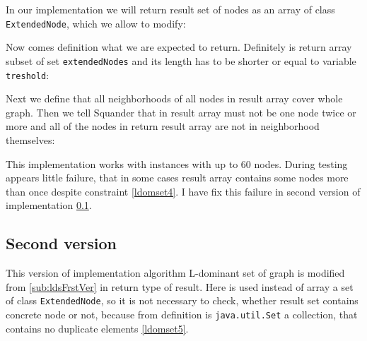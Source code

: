 \documentclass[11pt,twoside,a4paper]{book}
\begin{document}
In our implementation we will return result set of nodes as an array of
class \verb|ExtendedNode|, which we allow to modify:



Now comes definition what we are expected to return. Definitely is return array
subset of set \verb|extendedNodes| and its length has to be shorter or equal to
variable \verb|treshold|:



Next we define that all neighborhoods of all nodes in result array cover
whole graph. Then we tell Squander that in result array must not be one node
twice or more and all of the nodes in return result array are not in
neighborhood themselves:



This implementation works with instances with up to 60 nodes. During
testing appears little failure, that in some cases result array contains some
nodes more than once despite constraint \ref{ldomset4}. I have fix this failure
in second version of implementation \ref{sub:ldsScndVer}.



\subsection{Second version}
\label{sub:ldsScndVer}

This version of implementation algorithm L-dominant set of graph is modified
from \ref{sub:ldsFrstVer} in return type of result. Here is used instead of
array a set of class \verb|ExtendedNode|, so it is not necessary to check,
whether result set contains concrete node or not, because from definition
\cite{oracle:javadocSet} is \verb|java.util.Set| a collection, that contains no
duplicate elements \ref{ldomset5}.


 
\end{document}

